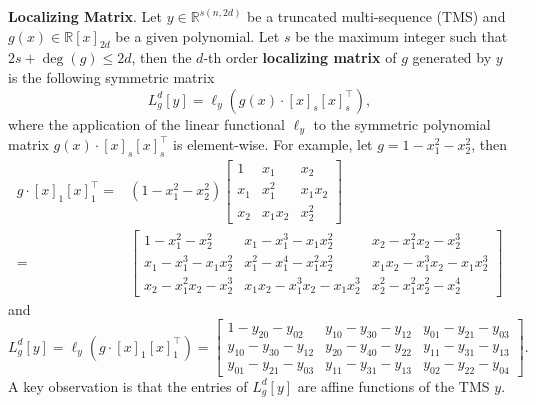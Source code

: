 \documentclass[
]{book}
\theoremstyle{definition}
\theoremstyle{definition}
\theoremstyle{definition}
\theoremstyle{definition}
\theoremstyle{remark}
\begin{document}
\textbf{Localizing Matrix}. Let \(y \in \mathbb{R}^{s(n,2d)}\) be a truncated multi-sequence (TMS) and \(g(x) \in \mathbb{R}[x]_{2d}\) be a given polynomial. Let \(s\) be the maximum integer such that \(2s + \deg(g) \leq 2d\), then the \(d\)-th order \textbf{localizing matrix} of \(g\) generated by \(y\) is the following symmetric matrix
\begin{equation}
L_{g}^d [y] = \ell_y\left( g(x)\cdot [x]_s [x]_s^\top\right),
\label{eq:localizing-matrix}
\end{equation}
where the application of the linear functional \(\ell_y\) to the symmetric polynomial matrix \(g(x) \cdot [x]_s [x]_s^\top\) is element-wise. For example, let \(g = 1- x_1^2 - x_2^2\), then
\begin{equation}
\begin{split}
g\cdot [x]_1 [x]_1^\top=&  (1-x_1^2 - x_2^2) \begin{bmatrix} 1 & x_1 & x_2 \\ 
x_1 & x_1^2 & x_1 x_2 \\
x_2 & x_1 x_2 & x_2^2 \end{bmatrix} \\
= & \begin{bmatrix} 1 - x_1^2 - x_2^2 & x_1 - x_1^3 - x_1 x_2^2 & x_2 - x_1^2 x_2 - x_2^3 \\
x_1 - x_1^3 - x_1 x_2^2 & x_1^2 - x_1^4 - x_1^2 x_2^2 & x_1 x_2 - x_1^3 x_2 - x_1 x_2^3 \\
x_2 - x_1^2 x_2 - x_2^3 & x_1 x_2 - x_1^3 x_2 - x_1 x_2^3 & x_2^2 - x_1^2 x_2^2 - x_2^4
\end{bmatrix}
\end{split}
\end{equation}
and
\[
L_g^d[y] = \ell_y (g\cdot [x]_1 [x]_1^\top) = \begin{bmatrix}
1 - y_{20} - y_{02} & y_{10} - y_{30} - y_{12} & y_{01} - y_{21} - y_{03} \\
y_{10} - y_{30} - y_{12} & y_{20} - y_{40} - y_{22} & y_{11} - y_{31} - y_{13} \\
y_{01} - y_{21} - y_{03} &  y_{11} - y_{31} - y_{13} & y_{02} - y_{22} - y_{04}
\end{bmatrix}.
\]
A key observation is that the entries of \(L_g^d[y]\) are affine functions of the TMS \(y\).
\end{document}
